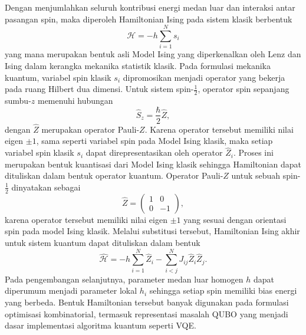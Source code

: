 Dengan menjumlahkan seluruh kontribusi energi medan luar dan interaksi antar pasangan spin, maka diperoleh Hamiltonian Ising pada sistem klasik berbentuk
\begin{equation}
\mathcal H
=
-
h\sum_{i=1}^{N}s_i
\end{equation}
yang mana merupakan bentuk asli Model Ising yang diperkenalkan oleh Lenz dan Ising dalam kerangka mekanika statistik klasik. Pada formulasi mekanika kuantum, variabel spin klasik $s_i$ dipromosikan menjadi operator yang bekerja pada ruang Hilbert dua dimensi. Untuk sistem spin-$\frac{1}{2}$, operator spin sepanjang sumbu-$z$ memenuhi hubungan
\begin{equation}
\hat{S}_z
=
\frac{\hbar}{2}\hat{Z},
\end{equation}
dengan $\hat{Z}$ merupakan operator Pauli-$Z$. Karena operator tersebut memiliki nilai eigen $\pm1$, sama seperti variabel spin pada Model Ising klasik, maka setiap variabel spin klasik $s_i$ dapat direpresentasikan oleh operator $\hat{Z}_i$. Proses ini merupakan bentuk kuantisasi dari Model Ising klasik sehingga Hamiltonian dapat dituliskan dalam bentuk operator kuantum. Operator Pauli-$Z$ untuk sebuah spin-$\frac{1}{2}$ dinyatakan sebagai
\begin{equation}
\hat{Z}
=
\begin{pmatrix}
1&0\\
0&-1
\end{pmatrix},
\end{equation}
karena operator tersebut memiliki nilai eigen $\pm1$ yang sesuai dengan orientasi spin pada model Ising klasik. Melalui substitusi tersebut, Hamiltonian Ising akhir untuk sistem kuantum dapat  dituliskan dalam bentuk
\begin{equation}
\hat{\mathcal H}
=
-
h\sum_{i=1}^{N}\hat Z_i
-
\sum_{i<j}^{N}J_{ij}\hat Z_i\hat Z_j.
\end{equation}
Pada pengembangan selanjutnya, parameter medan luar homogen $h$ dapat diperumum menjadi parameter lokal $h_i$ sehingga setiap spin memiliki bias energi yang berbeda. Bentuk Hamiltonian tersebut banyak digunakan pada formulasi optimisasi kombinatorial, termasuk representasi masalah QUBO yang menjadi dasar implementasi algoritma kuantum seperti VQE.

